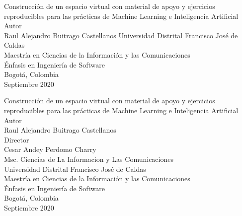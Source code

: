 \BgThispage  %
\begin{center}
\onehalfspacing %
\thispagestyle{empty}
Construcción de un espacio virtual con material de apoyo y ejercicios reproducibles para las prácticas de Machine Learning e Inteligencia Artificial 
\vfill
Autor\\

Raul Alejandro Buitrago Castellanos
\vfill
Universidad Distrital Francisco José de Caldas \\
Maestría en Ciencias de la Información y las Comunicaciones \\
Énfasis en Ingeniería de Software \\
Bogotá, Colombia \\
Septiembre 2020
\end{center}




\newpage
\BgThispage  %
\thispagestyle{empty}
\begin{center} 
\onehalfspacing %
Construcción de un espacio virtual con material de apoyo y ejercicios reproducibles para las prácticas de Machine Learning e Inteligencia Artificial
\vfill
Autor\\
Raul Alejandro Buitrago Castellanos\\ [5em]
Director \\
Cesar Andey Perdomo Charry \\
Msc. Ciencias de La Informacion y Las Comunicaciones\\
\vfill
Universidad Distrital Francisco José de Caldas \\
Maestría en Ciencias de la Información y las Comunicaciones \\
Énfasis en Ingeniería de Software \\
Bogotá, Colombia \\
Septiembre 2020
\end{center}
